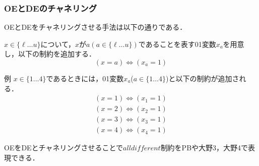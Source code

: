 \documentclass [dvipdfmx,11pt]{beamer}
\newcommand{\alldifferent}{$alldifferent$}
\begin{document}
\begin{frame}
    \frametitle{OEとDEのチャネリング}
    OEとDEをチャネリングさせる手法は以下の通りである．
    \begin{block}{}
        $x \in \{\ell \dots u\}$について，$x$が$a (a \in \{\ell \dots u\})$であることを表す01変数$x_{a}$を用意し，以下の制約を追加する．
        \vspace{-3mm}
        \[
            (x = a) \Leftrightarrow (x_{a} = 1)
        \]
    \end{block}
    \begin{exampleblock}{例}
        $x \in \{1 \dots 4\}$であるときには，01変数$x_a$($a \in \{ 1 \dots 4\}$)と以下の制約が追加される．
        \vspace{-3mm}
        \begin{eqnarray*}
            (x = 1) \Leftrightarrow (x_1 = 1) \\
            (x = 2) \Leftrightarrow (x_2 = 1) \\
            (x = 3) \Leftrightarrow (x_3 = 1) \\
            (x = 4) \Leftrightarrow (x_4 = 1)
        \end{eqnarray*}
    \end{exampleblock}
    OEをDEとチャネリングさせることで{\alldifferent}制約をPBや大野3，大野4で表現できる．
\end{frame}
\end{document}
